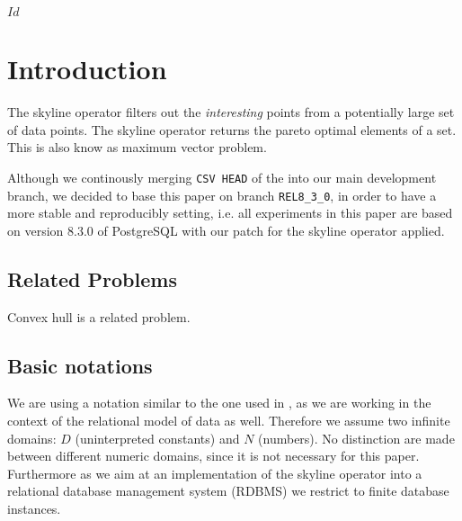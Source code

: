 
\svnInfo $Id$

\newcommand\schema[1]{\ensuremath{\mathcal{#1}}}
\newcommand\relation[1]{\ensuremath{\textnormal{\bf\textsf{#1}}}}

\newcommand\imp{\Rightarrow}

\newcommand\inlinesql[1]{{\tt #1}}
\newcommand\srcref[1]{{\tt #1}}
\newcommand\postgresdocu[2]{\href{http://www.postgresql.org/docs/8.3/static/#1}{#2}}
\newtheorem{definition}{Definition}

\chapter{Introduction\revision}
\label{chap:Introduction}

The skyline operator \citep{Borzsonyi2001} filters out the \emph{interesting} points from a potentially large set of data points. The skyline operator returns the pareto optimal elements of a set. This is also know as maximum vector problem.

Although we continously merging \texttt{CSV HEAD} of the  
into our main development branch, we decided to base this paper on branch \texttt{REL8\_3\_0}, 
in order to have a more stable and reproducibly setting, i.e. all experiments in this paper are based on version 8.3.0 of PostgreSQL with our patch for the skyline operator applied.

\section{Related Problems}
Convex hull is a related problem.


\section{Basic notations}
We are using a notation similar to the one used in \citep{Chomicki2002, Chomicki2003a}, as we are working in the context of the relational model of data as well. Therefore we assume two infinite domains: $D$ (uninterpreted constants) and $N$ (numbers). No distinction are made between different numeric domains, since it is not necessary for this paper. Furthermore as we aim at an implementation of the skyline operator into a relational database management system (RDBMS) we restrict to finite database instances.

